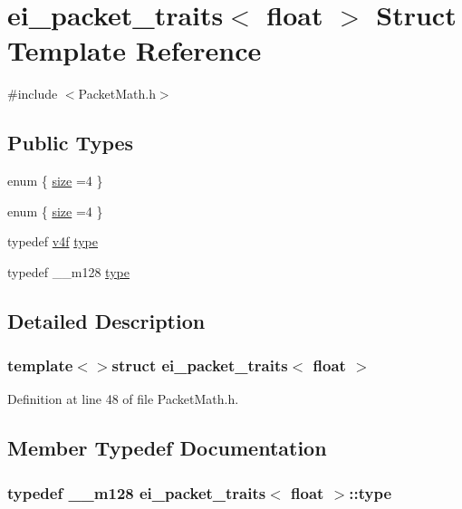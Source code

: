 \hypertarget{structei__packet__traits_3_01float_01_4}{\section{ei\-\_\-packet\-\_\-traits$<$ float $>$ Struct Template Reference}
\label{structei__packet__traits_3_01float_01_4}
}


{\ttfamily \#include $<$Packet\-Math.\-h$>$}

\subsection*{Public Types}
\begin{DoxyCompactItemize}
\item 
enum \{ \hyperlink{structei__packet__traits_3_01float_01_4_a1ddb0f3d8f49102d406f6448e72156b3ac1adc8ee30145fa8d745c6c2d6b3bbba}{size} =4
 \}
\item 
enum \{ \hyperlink{structei__packet__traits_3_01float_01_4_a1ddb0f3d8f49102d406f6448e72156b3ac1adc8ee30145fa8d745c6c2d6b3bbba}{size} =4
 \}
\item 
typedef \hyperlink{_alti_vec_2_packet_math_8h_a797e34bb4901532e01ef24c9f9458bf2}{v4f} \hyperlink{structei__packet__traits_3_01float_01_4_ac434a034c7bdc495d5b62769f65723cf}{type}
\item 
typedef \-\_\-\-\_\-m128 \hyperlink{structei__packet__traits_3_01float_01_4_a0e58f91b8c4bc7c615c10cd579f147d7}{type}
\end{DoxyCompactItemize}


\subsection{Detailed Description}
\subsubsection*{template$<$$>$struct ei\-\_\-packet\-\_\-traits$<$ float $>$}



Definition at line 48 of file Packet\-Math.\-h.



\subsection{Member Typedef Documentation}
\hypertarget{structei__packet__traits_3_01float_01_4_a0e58f91b8c4bc7c615c10cd579f147d7}{
\subsubsection[{type}]{\setlength{\rightskip}{0pt plus 5cm}typedef \-\_\-\-\_\-m128 {\bf ei\-\_\-packet\-\_\-traits}$<$ {\bf float} $>$\-::{\bf type}}}\label{structei__packet__traits_3_01float_01_4_a0e58f91b8c4bc7c615c10cd579f147d7}


